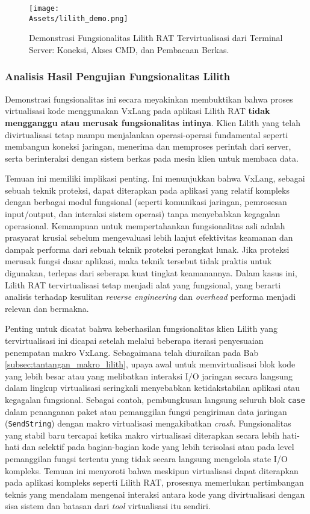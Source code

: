 \begin{figure}[H]
    \centering
    \texttt{[image: \\Assets/lilith\_demo.png]} 
    \caption{Demonstrasi Fungsionalitas Lilith RAT Tervirtualisasi dari Terminal Server: Koneksi, Akses CMD, dan Pembacaan Berkas.}
    \label{fig:lilith_demo_terminal_fungsionalitas}
\end{figure}

\subsubsection{Analisis Hasil Pengujian Fungsionalitas Lilith}
Demonstrasi fungsionalitas ini secara meyakinkan membuktikan bahwa proses virtualisasi kode menggunakan VxLang pada aplikasi Lilith RAT \textbf{tidak mengganggu atau merusak fungsionalitas intinya}. Klien Lilith yang telah divirtualisasi tetap mampu menjalankan operasi-operasi fundamental seperti membangun koneksi jaringan, menerima dan memproses perintah dari server, serta berinteraksi dengan sistem berkas pada mesin klien untuk membaca data.

Temuan ini memiliki implikasi penting. Ini menunjukkan bahwa VxLang, sebagai sebuah teknik proteksi, dapat diterapkan pada aplikasi yang relatif kompleks dengan berbagai modul fungsional (seperti komunikasi jaringan, pemrosesan input/output, dan interaksi sistem operasi) tanpa menyebabkan kegagalan operasional. Kemampuan untuk mempertahankan fungsionalitas asli adalah prasyarat krusial sebelum mengevaluasi lebih lanjut efektivitas keamanan dan dampak performa dari sebuah teknik proteksi perangkat lunak. Jika proteksi merusak fungsi dasar aplikasi, maka teknik tersebut tidak praktis untuk digunakan, terlepas dari seberapa kuat tingkat keamanannya. Dalam kasus ini, Lilith RAT tervirtualisasi tetap menjadi alat yang fungsional, yang berarti analisis terhadap kesulitan \textit{reverse engineering} dan \textit{overhead} performa menjadi relevan dan bermakna.

Penting untuk dicatat bahwa keberhasilan fungsionalitas klien Lilith yang tervirtualisasi ini dicapai setelah melalui beberapa iterasi penyesuaian penempatan makro VxLang. Sebagaimana telah diuraikan pada Bab \ref{subsec:tantangan_makro_lilith}, upaya awal untuk memvirtualisasi blok kode yang lebih besar atau yang melibatkan interaksi I/O jaringan secara langsung dalam lingkup virtualisasi seringkali menyebabkan ketidakstabilan aplikasi atau kegagalan fungsional. Sebagai contoh, pembungkusan langsung seluruh blok \texttt{case} dalam penanganan paket atau pemanggilan fungsi pengiriman data jaringan (\texttt{SendString}) dengan makro virtualisasi mengakibatkan \textit{crash}. Fungsionalitas yang stabil baru tercapai ketika makro virtualisasi diterapkan secara lebih hati-hati dan selektif pada bagian-bagian kode yang lebih terisolasi atau pada level pemanggilan fungsi tertentu yang tidak secara langsung mengelola state I/O kompleks. Temuan ini menyoroti bahwa meskipun virtualisasi dapat diterapkan pada aplikasi kompleks seperti Lilith RAT, prosesnya memerlukan pertimbangan teknis yang mendalam mengenai interaksi antara kode yang divirtualisasi dengan sisa sistem dan batasan dari \textit{tool} virtualisasi itu sendiri.

